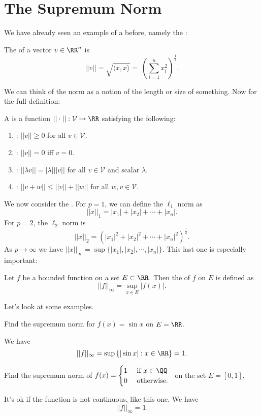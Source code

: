 \section{The Supremum Norm}
We have already seen an example of a  before, namely the : 
\begin{definition}
The  of a vector $v \in \RR^n$ is 
\[ ||v|| = \sqrt{\langle x,x \rangle} = \ \left ( \sum_{i=1}^n x_i^2 \right )^\frac{1}{2}. \]
\end{definition}
We can think of the norm as a notion of the length or size of something. Now for the full definition:
\begin{definition}
A  is a function $||\cdot||: \mathcal{V} \to \RR$ satisfying the following:
\begin{enumerate}
\item {}: $||v|| \geq 0$ for all $v \in \mathcal{V}$. 
\item {}: $||v|| = 0$ iff $v = 0$. 
\item {}: $||\lambda v|| = |\lambda|||v||$ for all $v \in \mathcal{V}$ and scalar $\lambda$. 
\item {}: $||v + w|| \leq ||v|| + ||w||$ for all $w,v \in \mathcal{V}$. 
\end{enumerate}
\end{definition}

We now consider the . For $p=1$, we can define the $\ell_1$ norm as 
\[ ||x||_1 = |x_1| + |x_2| + \cdots + |x_n|. \]
For $p=2$, the $\ell_2$ norm is 
\[ ||x||_2 = (|x_1|^2 + |x_2|^2 + \cdots + |x_n|^2)^\frac{1}{2}. \] 
As $p \to \infty$ we have $||x||_\infty = \sup{\{|x_1|, |x_2|, \cdots, |x_n|\}}$. This last one is especially important:
\begin{definition}
Let $f$ be a bounded function on a set $E \subset \RR$. Then the  of $f$ on $E$ is defined as 
\[ ||f||_\infty = \sup\limits_{x \in E} |f(x)|. \]
\end{definition}
Let's look at some examples. 
\begin{example}
Find the supremum norm for $f(x) = \sin{x}$ on $E = \RR$. 
\end{example}
\begin{sol}
We have 
\[ ||f||_\infty = \sup{\{|\sin{x}| : x \in \RR\}} = 1. \] 
\end{sol}

\begin{example}
Find the supremum norm of $f(x) = \begin{cases} 1 &\text{ if } x \in \QQ \\ 0 &\text{ otherwise. } \end{cases}$ on the set $E = [0,1]$. 
\end{example}
\begin{sol}
It's ok if the function is not continuous, like this one. We have 
\[ ||f||_\infty = 1. \] 
\end{sol}

